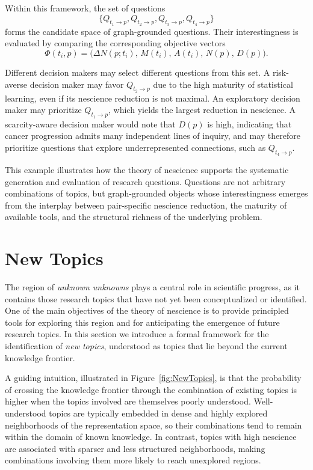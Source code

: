 \begin{example}
Within this framework, the set of questions
\[
\{ Q_{t_1 \to p}, Q_{t_2 \to p}, Q_{t_3 \to p}, Q_{t_4 \to p} \}
\]
forms the candidate space of graph-grounded questions. Their interestingness is evaluated by comparing the corresponding objective vectors
\[
\Phi(t_i,p) = \bigl( \Delta N(p;t_i),\, M(t_i),\, A(t_i),\, N(p),\, D(p) \bigr).
\]

Different decision makers may select different questions from this set. A risk-averse decision maker may favor $Q_{t_2 \to p}$ due to the high maturity of statistical learning, even if its nescience reduction is not maximal. An exploratory decision maker may prioritize $Q_{t_1 \to p}$, which yields the largest reduction in nescience. A scarcity-aware decision maker would note that $D(p)$ is high, indicating that cancer progression admits many independent lines of inquiry, and may therefore prioritize questions that explore underrepresented connections, such as $Q_{t_4 \to p}$.
\end{example}

This example illustrates how the theory of nescience supports the systematic generation and evaluation of research questions. Questions are not arbitrary combinations of topics, but graph-grounded objects whose interestingness emerges from the interplay between pair-specific nescience reduction, the maturity of available tools, and the structural richness of the underlying problem.

%
%


\section{New Topics}
\label{sec:New_Research_Topics}

The region of \emph{unknown unknowns} plays a central role in scientific progress, as it contains those research topics that have not yet been conceptualized or identified. One of the main objectives of the theory of nescience is to provide principled tools for exploring this region and for anticipating the emergence of future research topics. In this section we introduce a formal framework for the identification of \emph{new topics}, understood as topics that lie beyond the current knowledge frontier.

A guiding intuition, illustrated in Figure~\ref{fig:NewTopics}, is that the probability of crossing the knowledge frontier through the combination of existing topics is higher when the topics involved are themselves poorly understood. Well-understood topics are typically embedded in dense and highly explored neighborhoods of the representation space, so their combinations tend to remain within the domain of known knowledge. In contrast, topics with high nescience are associated with sparser and less structured neighborhoods, making combinations involving them more likely to reach unexplored regions.

